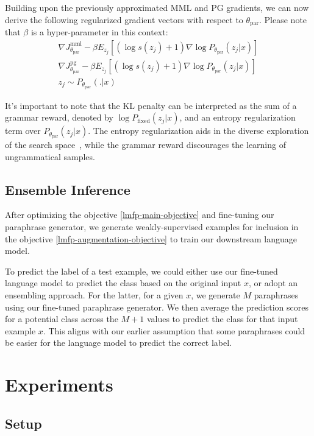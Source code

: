 \documentclass[11pt]{article}
\begin{document}
Building upon the previously approximated MML and PG gradients, we can now derive the following regularized gradient vectors with respect to $\theta_{\text{par}}$. Please note that $\beta$ is a hyper-parameter in this context:
\begin{multline}
\nabla J^{\text{mml}}_{\theta_{\text{par}}} - \beta E_{z_{j}} [(\log s(z_{j}) + 1) \nabla \log P_{\theta_{\text{par}}} (z_{j} | x)] \\
\nabla J^{\text{pg}}_{\theta_{\text{par}}} - \beta E_{z_{j}} [(\log s(z_{j}) + 1) \nabla \log P_{\theta_{\text{par}}} (z_{j} | x)] \\
z_{j} \sim P_{\theta_{\text{par}}}(.|x)
\label{lmfp-expect-ppo-gradient}
\end{multline}

It's important to note that the KL penalty can be interpreted as the sum of a grammar reward, denoted by $\log P_{\text{fixed}}(z_{j}|x)$, and an entropy regularization term over $P_{\theta_{\text{par}}} (z_{j} | x)$. The entropy regularization aids in the diverse exploration of the search space~\cite{DBLP:journals/corr/MnihBMGLHSK16}, while the grammar reward discourages the learning of ungrammatical samples.

\subsection{Ensemble Inference}
\label{ensemble-inference}
After optimizing the objective \ref{lmfp-main-objective} and fine-tuning our paraphrase generator, we generate weakly-supervised examples for inclusion in the objective \ref{lmfp-augmentation-objective} to train our downstream language model.

To predict the label of a test example, we could either use our fine-tuned language model to predict the class based on the original input $x$, or adopt an ensembling approach. For the latter, for a given $x$, we generate $M$ paraphrases using our fine-tuned paraphrase generator. We then average the prediction scores for a potential class across the $M+1$ values to predict the class for that input example $x$. This aligns with our earlier assumption that some paraphrases could be easier for the language model to predict the correct label.
\section{Experiments}

\subsection{Setup}
\end{document}
